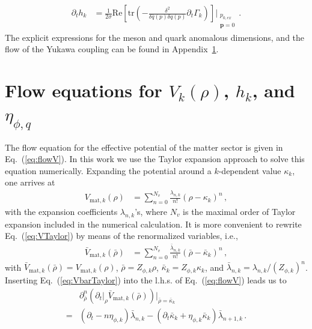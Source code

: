 \documentclass[%
reprint,
superscriptaddress,
showpacs,preprintnumbers,
amsmath,amssymb,
aps,
prd,
]{revtex4-1}
\def\Eq#1{Eq.~(\ref{#1})}
\def\app#1{Appendix~\ref{#1}}
\begin{document}
	\begin{align}
		\partial_t h_k&=\frac{1}{2 \sigma}\mathrm{Re}\left[\mathrm{tr}\left(-\frac{\delta^2}{\delta\bar{q}(p)
			\delta q(p)}\partial_t \Gamma_k\right)\right]\Bigg|_{\substack{p_{0,ex}\\ \bm{p}=0}}\,.  \label{eq:dth}
	\end{align}
	The explicit expressions for the meson and quark anomalous dimensions, and the flow of the Yukawa coupling can be found in \app{app:flowV}.
	
	
	\section{Flow equations for $V_k(\rho)$, $h_k$, and $\eta_{\phi,q}$}
	\label{app:flowV}
	
	The flow equation for the effective potential of the matter sector is given in \Eq{eq:flowV}. In this work we use the Taylor expansion approach to solve this equation numerically. Expanding the potential around a $k$-dependent value $\kappa_k$, one arrives at 
	\begin{align}
		V_{\mathrm{mat}, k}(\rho)&=\sum_{n=0}^{N_v}\frac{\lambda_{n,k}}{n!}(\rho-\kappa_k)^n\,, \label{eq:VTaylor}
	\end{align}
	with the expansion coefficients $\lambda_{n,k}$'s, where $N_v$ is the maximal order of Taylor expansion included in the numerical calculation. It is more convenient to rewrite \Eq{eq:VTaylor} by means of the renormalized variables, i.e.,
	\begin{align}
		\bar V_{\mathrm{mat}, k}(\bar \rho)&=\sum_{n=0}^{N_v}\frac{\bar\lambda_{n,k}}{n!}(\bar \rho-\bar \kappa_k)^n\,,\label{eq:VbarTaylor}
	\end{align}
	with $\bar V_{\mathrm{mat}, k}(\bar \rho)=V_{\mathrm{mat}, k}(\rho)$, $\bar \rho=Z_{\phi,k} \rho$, $\bar \kappa_k=Z_{\phi,k}\kappa_k$, and $\bar \lambda_{n,k}=\lambda_{n,k}/(Z_{\phi,k})^n$. Inserting \Eq{eq:VbarTaylor} into the l.h.s. of \Eq{eq:flowV} leads us to
	\begin{align}
		&\partial^n_{\bar \rho}\left(\partial_t\big|_{\rho} \bar V_{\mathrm{mat}, k}(\bar \rho)\right)\Big|_{\bar \rho=\bar \kappa_k}\nonumber\\[2ex]
		=&(\partial_t -n\eta_{\phi,k})\bar{\lambda}_{n,k}-(\partial_t \bar \kappa_k+\eta_{\phi,k}\bar \kappa_k)\bar \lambda_{n+1,k}\,.\label{eq:drhoV}
	\end{align}
	
\end{document}
